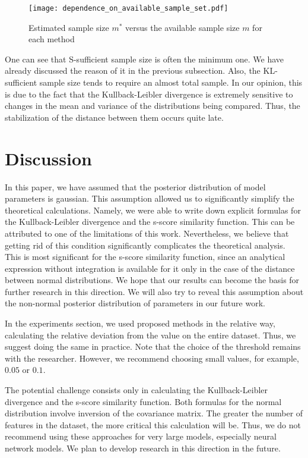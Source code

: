\documentclass[sn-mathphys-num]{sn-jnl}%
\begin{document}
\begin{figure}[ht]
    \centering
    \texttt{[image: dependence\_on\_available\_sample\_set.pdf]}
    \caption{Estimated sample size $m^*$ versus the available sample size $m$ for each method}
    \label{dependence_on_available_sample_set}
\end{figure}

One can see that S-sufficient sample size is often the minimum one. We have already discussed the reason of it in the previous subsection. Also, the KL-sufficient sample size tends to require an almost total sample. In our opinion, this is due to the fact that the Kullback-Leibler divergence is extremely sensitive to changes in the mean and variance of the distributions being compared. Thus, the stabilization of the distance between them occurs quite late.

\section{Discussion}

In this paper, we have assumed that the posterior distribution of model parameters is gaussian. This assumption allowed us to significantly simplify the theoretical calculations. Namely, we were able to write down explicit formulas for the Kullback-Leibler divergence and the s-score similarity function. This can be attributed to one of the limitations of this work. Nevertheless, we believe that getting rid of this condition significantly complicates the theoretical analysis. This is most significant for the s-score similarity function, since an analytical expression without integration is available for it only in the case of the distance between normal distributions. We hope that our results can become the basis for further research in this direction. We will also try to reveal this assumption about the non-normal posterior distribution of parameters in our future work.

In the experiments section, we used proposed methods in the relative way, calculating the relative deviation from the value on the entire dataset. Thus, we suggest doing the same in practice. Note that the choice of the threshold remains with the researcher. However, we recommend choosing small values, for example, $0.05$ or $0.1$.

The potential challenge consists only in calculating the Kullback-Leibler divergence and the s-score similarity function. Both formulas for the normal distribution involve inversion of the covariance matrix. The greater the number of features in the dataset, the more critical this calculation will be. Thus, we do not recommend using these approaches for very large models, especially neural network models. We plan to develop research in this direction in the future.
\end{document}
